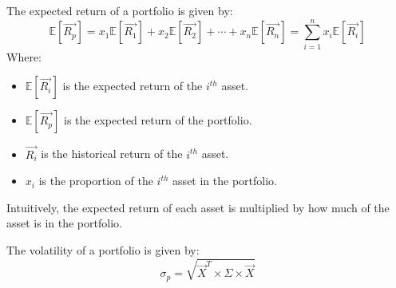 \begin{definition}
    The expected return of a portfolio is given by:
    \begin{equation}
        \mathbb{E}[\overrightarrow{R_p}] = x_1 \mathbb{E}[\overrightarrow{R_1}] + x_2 \mathbb{E}[\overrightarrow{R_2}] + \cdots + x_n \mathbb{E}[\overrightarrow{R_n}] = \sum_{i=1}^{n} x_i \mathbb{E}[\overrightarrow{R_i}]
    \end{equation}
    Where:
    \begin{itemize}
        \item $\mathbb{E}[\overrightarrow{R_i}]$ is the expected return of the $i^{th}$ asset.
        \item $\mathbb{E}[\overrightarrow{R_p}]$ is the expected return of the portfolio.
        \item $\overrightarrow{R_i}$ is the historical return of the $i^{th}$ asset.
        \item $x_i$ is the proportion of the $i^{th}$ asset in the portfolio.
    \end{itemize}
    Intuitively, the expected return of each asset is multiplied by how much of the asset is in the portfolio.
\end{definition}



\begin{definition}
    The volatility of a portfolio is given by:
    \begin{equation}
        \sigma_p = \sqrt{\overrightarrow{X}^T \times \Sigma \times \overrightarrow{X}}
    \end{equation}
\end{definition}

